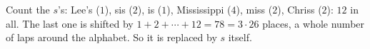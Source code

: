 Count the $s$'s: Lee's ($1$), sis ($2$), is ($1$), Mississippi ($4$), miss ($2$), Chriss ($2$): $12$ in all. The last one is shifted by $1+2+\cdots+12=78=3\cdot26$ places, a whole number of laps around the alphabet. So it is replaced by $\boxed{s}$ itself.

